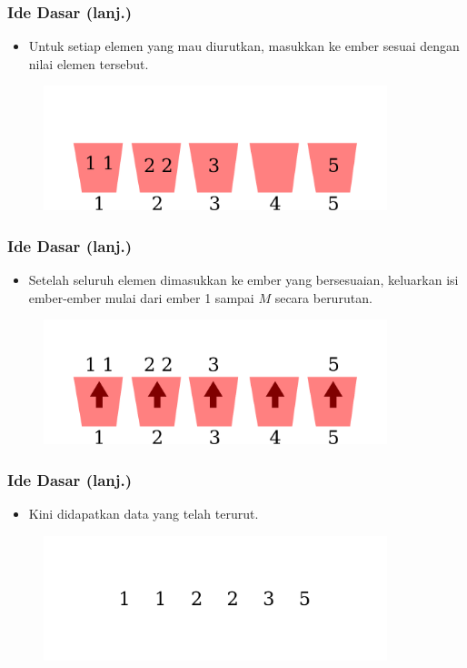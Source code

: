 \begin{frame}
\frametitle{Ide Dasar (lanj.)}
  \begin{itemize}
    \item Untuk setiap elemen yang mau diurutkan, masukkan ke ember
    sesuai dengan nilai elemen tersebut.
  \end{itemize}
  \begin{figure}
    \includegraphics[width=10cm]{asset/counting-sort-8.pdf}
  \end{figure}
\end{frame}

\begin{frame}
\frametitle{Ide Dasar (lanj.)}
  \begin{itemize}
    \item Setelah seluruh elemen dimasukkan ke ember yang
    bersesuaian, keluarkan isi ember-ember mulai dari ember 1
    sampai $M$ secara berurutan.
  \end{itemize}
  \begin{figure}
    \includegraphics[width=10cm]{asset/counting-sort-9.pdf}
  \end{figure}
\end{frame}

\begin{frame}
\frametitle{Ide Dasar (lanj.)}
  \begin{itemize}
    \item Kini didapatkan data yang telah terurut.
  \end{itemize}
  \begin{figure}
    \includegraphics[width=10cm]{asset/counting-sort-10.pdf}
  \end{figure}
\end{frame}

